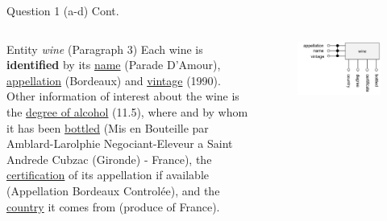 \begin{frame}[fragile]{Question 1 (a-d) Cont.}
\begin{columns}
	\begin{exampleblock}{Entity \textit{wine} (Paragraph 3)}
		Each wine is \textbf{identified} by its \underline{name} (Parade D'Amour), \underline{appellation} (Bordeaux) and \underline{vintage} (1990). Other information of interest about the wine is the \underline{degree of alcohol} (11.5), where and by whom it has been \underline{bottled} (Mis en Bouteille par Amblard-Larolphie Negociant-Eleveur a Saint Andrede Cubzac (Gironde) - France), the \underline{certification} of its appellation if available (Appellation Bordeaux Controlée), and the \underline{country} it comes from
		(produce of France).
	\end{exampleblock}
	\begin{figure}
		\includegraphics[width=1\textwidth, trim=0.9cm 0 0 0, clip]{t4/images/wine_entity.png}
	\end{figure}
\end{columns}
\end{frame}

